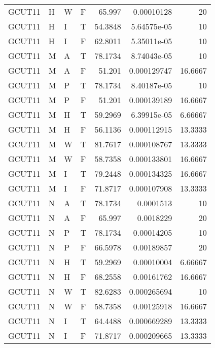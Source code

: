 \begin{table}[htb!]
{\begin{tabular}{llllrrr}
            GCUT11   & H     & W     & F          & 65.997     & 0.00010128  & 20       \\
            GCUT11   & H     & I     & T          & 54.3848    & 5.64575e-05 & 10       \\
            GCUT11   & H     & I     & F          & 62.8011    & 5.35011e-05 & 10       \\
            GCUT11   & M     & A     & T          & 78.1734    & 8.74043e-05 & 10       \\
            GCUT11   & M     & A     & F          & 51.201     & 0.000129747 & 16.6667  \\
            GCUT11   & M     & P     & T          & 78.1734    & 8.40187e-05 & 10       \\
            GCUT11   & M     & P     & F          & 51.201     & 0.000139189 & 16.6667  \\
            GCUT11   & M     & H     & T          & 59.2969    & 6.39915e-05 & 6.66667  \\
            GCUT11   & M     & H     & F          & 56.1136    & 0.000112915 & 13.3333  \\
            GCUT11   & M     & W     & T          & 81.7617    & 0.000108767 & 13.3333  \\
            GCUT11   & M     & W     & F          & 58.7358    & 0.000133801 & 16.6667  \\
            GCUT11   & M     & I     & T          & 79.2448    & 0.000134325 & 16.6667  \\
            GCUT11   & M     & I     & F          & 71.8717    & 0.000107908 & 13.3333  \\
            GCUT11   & N     & A     & T          & 78.1734    & 0.0001513   & 10       \\
            GCUT11   & N     & A     & F          & 65.997     & 0.0018229   & 20       \\
            GCUT11   & N     & P     & T          & 78.1734    & 0.00014205  & 10       \\
            GCUT11   & N     & P     & F          & 66.5978    & 0.00189857  & 20       \\
            GCUT11   & N     & H     & T          & 59.2969    & 0.00010004  & 6.66667  \\
            GCUT11   & N     & H     & F          & 68.2558    & 0.00161762  & 16.6667  \\
            GCUT11   & N     & W     & T          & 82.6283    & 0.000265694 & 10       \\
            GCUT11   & N     & W     & F          & 58.7358    & 0.00125918  & 16.6667  \\
            GCUT11   & N     & I     & T          & 64.4488    & 0.000669289 & 13.3333  \\
            GCUT11   & N     & I     & F          & 71.8717    & 0.000209665 & 13.3333  \\
            \hline
        \end{tabular}
    }{
    }
\end{table} 
